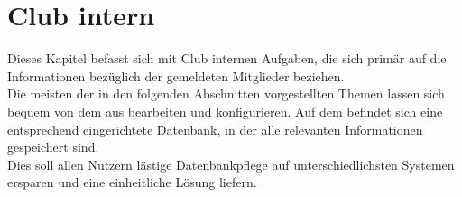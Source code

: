 \section{Club intern}

\noindent
Dieses Kapitel befasst sich mit Club internen Aufgaben, die sich primär auf
die Informationen bezüglich der gemeldeten Mitglieder beziehen.\\[.1cm]

\noindent
Die meisten der in den folgenden Abschnitten vorgestellten Themen lassen sich
bequem von dem \bb \ser aus bearbeiten und konfigurieren. Auf dem \ser befindet sich
eine entsprechend eingerichtete Datenbank, in der alle relevanten Informationen
gespeichert sind.\\[.1cm]

\noindent
Dies soll allen Nutzern lästige Datenbankpflege auf unterschiedlichsten Systemen
ersparen und eine einheitliche Lösung liefern.
